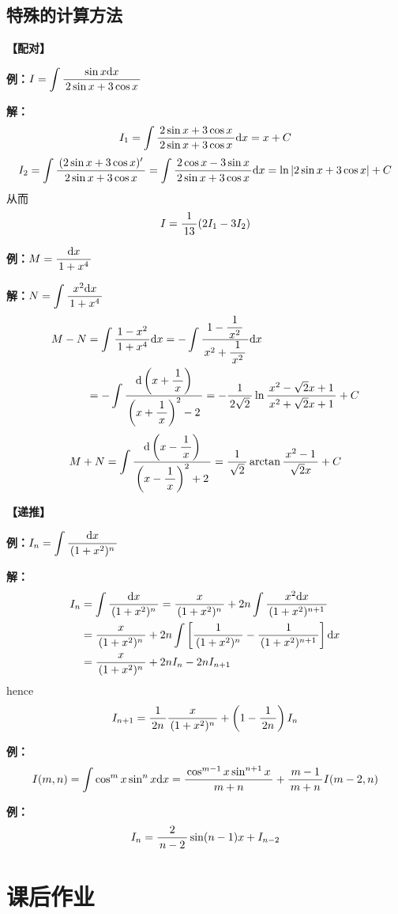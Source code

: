 \begin{shaded}

\section*{特殊的计算方法}

{\bf 【配对】}

{\bf 例：}$I=\dint\df{\sin x\d x}{2\sin x+3\cos x}$

{\bf 解：}
$$I_1=\dint\df{2\sin x+3\cos x}{2\sin x+3\cos x}\d x=x+C$$
$$I_2=\dint\df{(2\sin x+3\cos x)'}{2\sin x+3\cos x}
=\dint\df{2\cos x-3\sin x}{2\sin x+3\cos x}\d x=\ln|2\sin x+3\cos x|+C$$
从而
$$I=\df1{13}(2I_1-3I_2)$$

{\bf 例：}$M=\df{\d x}{1+x^4}$

{\bf 解：}$N=\dint\df{x^2\d x}{1+x^4}$
\begin{align}
M-N&=\dint\df{1-x^2}{1+x^4}\d x=-\dint\df{1-\df1{x^2}}{x^2+\df1{x^2}}\d
x\notag\\
&=-\dint\df{\d\left(x+\df1x\right)}{\left(x+\df1x\right)^2-2}
=-\df1{2\sqrt2}\ln\df{x^2-\sqrt2x+1}{x^2+\sqrt2x+1}+C\notag
\end{align}
$$M+N=\dint\df{\d\left(x-\df1x\right)}{\left(x-\df1x\right)^2+2}
=\df1{\sqrt2}\arctan\df{x^2-1}{\sqrt2x}+C$$

{\bf 【递推】}

{\bf 例：}$I_n=\dint\df{\d x}{(1+x^2)^n}$

{\bf 解：}
\begin{align}
I_n&=\dint\df{\d x}{(1+x^2)^n}=\df x{(1+x^2)^n}+2n\dint\df{x^2\d x}
{(1+x^2)^{n+1}}\notag\\
&=\df x{(1+x^2)^n}+2n\dint\left[\df1{(1+x^2)^n}-
\df1{(1+x^2)^{n+1}}\right]\d x\notag\\
&=\df x{(1+x^2)^n}+2nI_n-2nI_{n+1}\notag
\end{align}
hence
$$I_{n+1}=\df1{2n}\df x{(1+x^2)^n}+\left(1-\df1{2n}\right)I_n$$

{\bf 例：}
$$I(m,n)=\dint\cos^mx\sin^nx\d x=
\df{\cos^{m-1}x\sin^{n+1}x}{m+n}+\df{m-1}{m+n}I(m-2,n)$$

{\bf 例：}
$$I_n=\df2{n-2}\sin(n-1)x+I_{n-2}$$
\end{shaded}

\newpage

\section*{课后作业}

